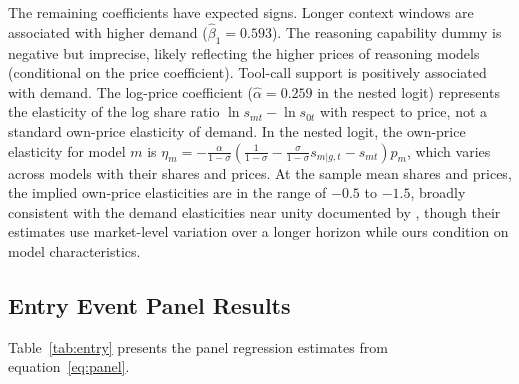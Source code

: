 \documentclass[11pt, a4paper]{article}
\begin{document}
The remaining coefficients have expected signs. Longer context windows are associated with higher demand ($\hat{\beta}_1 = 0.593$). The reasoning capability dummy is negative but imprecise, likely reflecting the higher prices of reasoning models (conditional on the price coefficient). Tool-call support is positively associated with demand. The log-price coefficient ($\hat{\alpha} = 0.259$ in the nested logit) represents the elasticity of the log share ratio $\ln s_{mt} - \ln s_{0t}$ with respect to price, not a standard own-price elasticity of demand. In the nested logit, the own-price elasticity for model $m$ is $\eta_m = -\frac{\alpha}{1-\sigma}\left(\frac{1}{1-\sigma} - \frac{\sigma}{1-\sigma} s_{m|g,t} - s_{mt}\right) p_m$, which varies across models with their shares and prices. At the sample mean shares and prices, the implied own-price elasticities are in the range of $-0.5$ to $-1.5$, broadly consistent with the demand elasticities near unity documented by \citet{demirer2025emerging}, though their estimates use market-level variation over a longer horizon while ours condition on model characteristics.

\subsection{Entry Event Panel Results}

Table~\ref{tab:entry} presents the panel regression estimates from equation~\eqref{eq:panel}.
\end{document}
